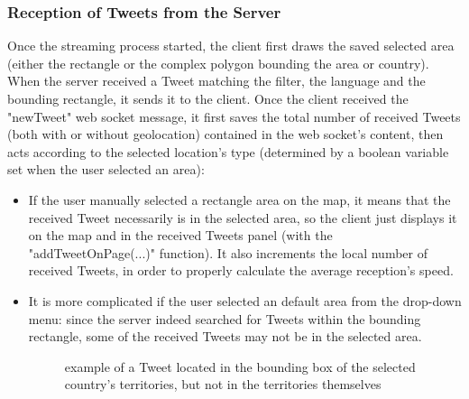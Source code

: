 \documentclass[a4paper,11pt]{report}
\begin{document}
\subsubsection{Reception of Tweets from the Server}
\label{receptionOfTweetsFromTheServer}
Once the streaming process started, the client first draws the saved selected area (either the rectangle or the complex polygon bounding the area or country). When the server received a Tweet matching the filter, the language and the bounding rectangle, it sends it to the client. Once the client received the "newTweet" web socket message, it first saves the total number of received Tweets (both with or without geolocation) contained in the web socket's content, then acts according to the selected location's type (determined by a boolean variable set when the user selected an area):
\begin{itemize}
	\item If the user manually selected a rectangle area on the map, it means that the received Tweet necessarily is in the selected area, so the client just displays it on the map and in the received Tweets panel (with the "addTweetOnPage(...)" function). It also increments the local number of received Tweets, in order to properly calculate the average reception's speed.
	\newpage
	\item It is more complicated if the user selected an default area from the drop-down menu: since the server indeed searched for Tweets within the bounding rectangle, some of the received Tweets may not be in the selected area.
	\begin{figure}[H]
	\vspace{-5pt}
	\begin{center}
	\vspace{-5pt}
	\caption{example of a Tweet located in the bounding box of the selected country's territories, but not in the territories themselves}
	\end{center}
	\end{figure}
	\vspace{-20pt}
	

\end{itemize}
\end{document}
